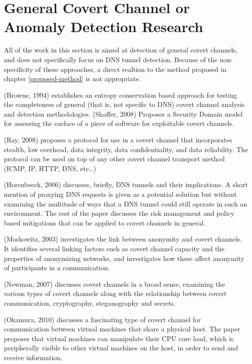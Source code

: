 \documentclass[12pt]{report}
\theoremstyle{remark}
\theoremstyle{definition}
\theoremstyle{definition}
\theoremstyle{definition}
\begin{document}
\section{General Covert Channel or Anomaly Detection Research} All of the work
in this section is aimed at detection of general covert channels, and does not
specifically focus on DNS tunnel detection. Because of the non-specificity of
these approaches, a direct realtion to the method proposed in chapter
\ref{proposed-method} is not appropriate.

(Browne, 1994)\cite{Browne1994} establishes an entropy conservation based
approach for testing the completeness of general (that is, not specific to DNS)
covert channel analysis and detection methodologies. (Shaffer,
2008)\cite{Shaffer2008} Proposes a Security Domain model for assessing the
surface of a piece of software for exploitable covert channels.

(Ray, 2008)\cite{Ray2008} proposes a protocol for use in a covert channel that
incorporates stealth, low overhead, data integrity, data confidentiality, and
data reliability. The protocol can be used on top of any other covert channel
transport method (ICMP, IP, HTTP, DNS, etc\ldots)

(Horenbeeck, 2006)\cite{Horenbeeck2006} discusses, briefly, DNS tunnels and
their implications. A short mention of proxying DNS requests is given as a
potential solution but without examining the multitude of ways that a DNS tunnel
could still operate in such an environment. The rest of the paper discusses the
risk management and policy based mitigations that can be applied to covert
channels in general.

(Moskowitz, 2003)\cite{Moskowitz2003} investigates the link between anonymity
and covert channels. It identifies several linking factors such as covert
channel capacity and the properties of anonymizing networks, and investigates
how these affect anonymity of participants in a communication.

(Newman, 2007)\cite{Newman2007} discusses covert channels in a broad sense,
examining the various types of covert channels along with the relationship
between covert communication, cryptography, steganography and secrets.

(Okamura, 2010)\cite{Okamura2010} discusses a fascinating type of covert channel
for communication between virtual machines that share a physical host. The paper
proposes that virtual machines can manipulate their CPU core load, which is
peripherally visible to other virtual machines on the host, in order to send and
receive information.
\end{document}
